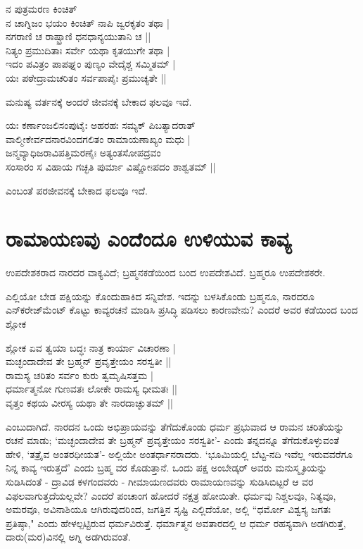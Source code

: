 \begin{shloka} 
ನ ಪುತ್ರಮರಣ ಕಿಂಚಿತ್‍\label{180}\\
ನ ಚಾಗ್ನಿಜಂ ಭಯಂ ಕಿಂಚಿತ್‍ ನಾಪಿ ಜ್ವರಕೃತಂ ತಥಾ |\\ 
ನಗರಾಣಿ ಚ ರಾಷ್ಟ್ರಾಣಿ ಧನಧಾನ್ಯಯುತಾನಿ ಚ ||\\ 
ನಿತ್ಯಂ ಪ್ರಮುದಿತಾಃ ಸರ್ವೇ ಯಥಾ ಕೃತಯುಗೇ ತಥಾ |\\ 
ಇದಂ ಪವಿತ್ರಂ ಪಾಪಘ್ನಂ ಪುಣ್ಯಂ ವೇದೈಶ್ಚ ಸಮ್ಮಿತಮ್‍ |\label{181}\\ 
ಯಃ ಪಠೇದ್ರಾಮಚರಿತಂ ಸರ್ವಪಾಪೈಃ ಪ್ರಮುಚ್ಯತೇ ||
\end{shloka} 

ಮನುಷ್ಯ ವರ್ತನಕ್ಕೆ ಅಂದರೆ ಜೀವನಕ್ಕೆ ಬೇಕಾದ ಫಲವೂ ಇದೆ. 

\begin{shloka} 
ಯಃ ಕರ್ಣಾಂಜಲಿಸಂಪುಟೈಃ ಅಹರಹಃ ಸಮ್ಯಕ್‍ ಪಿಬತ್ಯಾದರಾತ್‍\label{181b}\\ 
ವಾಲ್ಮೀಕೇರ್ವದನಾರವಿಂದಗಲಿತಂ ರಾಮಾಯಣಾಖ್ಯಂ ಮಧು |\\ 
ಜನ್ಮವ್ಯಾಧಿಜರಾವಿಪತ್ತಿಮರಣೈಃ ಅತ್ಯಂತಸೋಪದ್ರವಂ\\ 
ಸಂಸಾರಂ ಸ ವಿಹಾಯ ಗಚ್ಛತಿ ಪುರ್ಮಾ ವಿಷ್ಣೋಃಪದಂ ಶಾಶ್ವತಮ್‍ ||
\end{shloka} 
ಎಂಬಂತೆ ಪರಜೀವನಕ್ಕೆ ಬೇಕಾದ ಫಲವೂ ಇದೆ. 

\section*{ರಾಮಾಯಣವು ಎಂದೆಂದೂ ಉಳಿಯುವ ಕಾವ್ಯ} 

ಉಪದೇಶಕರಾದ ನಾರದರ ವಾಕ್ಯವಿದೆ; ಬ್ರಹ್ಮನಕಡೆಯಿಂದ ಬಂದ ಉಪದೇಶವಿದೆ. ಬ್ರಹ್ಮರೂ ಉಪದೇಶಕರೇ. 

ಎಲ್ಲಿಯೋ ಬೇಡ ಪಕ್ಷಿಯನ್ನು ಕೊಂದುಹಾಕಿದ ಸನ್ನಿವೇಶ. ಇದನ್ನು ಬಳಸಿಕೊಂಡು ಬ್ರಹ್ಮನೂ, ನಾರದರೂ ಎನ್‍ಕರೇಜ್‍ಮೆಂಟ್‍ {} ಕೊಟ್ಟು ಕಾವ್ಯರಚನೆ ಮಾಡಿಸಿ ಪ್ರಸಿದ್ಧಿ ಪಡಿಸಲು ಕಾರಣವೇನು? ಎಂದರೆ ಅವರ ಕಡೆಯಿಂದ ಬಂದ ಶ್ಲೋಕ 

\begin{shloka}
ಶ್ಲೋಕ ಏವ ತ್ವಯಾ ಬದ್ಧಃ ನಾತ್ರ ಕಾರ್ಯಾ ವಿಚಾರಣಾ |\label{181c}\\ 
ಮಚ್ಛಂದಾದೇವ ತೇ ಬ್ರಹ್ಮನ್‍ ಪ್ರವೃತ್ತೇಯಂ ಸರಸ್ವತೀ ||\\ 
ರಾಮಸ್ಯ ಚರಿತಂ ಸರ್ವಂ ಕುರು ತ್ವಮೃಷಿಸತ್ತಮ |\\ 
ಧರ್ಮಾತ್ಮನೋ ಗುಣವತಃ ಲೋಕೇ ರಾಮಸ್ಯ ಧೀಮತಃ ||\\ 
ವೃತ್ತಂ ಕಥಯ ವೀರಸ್ಯ ಯಥಾ ತೇ ನಾರದಾಚ್ಘುತಮ್‍ ||
\end{shloka} 

ಎಂಬುದಾಗಿದೆ. ನಾರದನ ಒಂದು ಅಭಿಪ್ರಾಯವನ್ನು ತೆಗೆದುಕೊಂಡು ಧರ್ಮ ಪ್ರಭುವಾದ ಆ ರಾಮನ ಚರಿತೆಯನ್ನು ರಚನೆ ಮಾಡು; `ಮಚ್ಛಂದಾದೇವ ತೇ ಬ್ರಹ್ಮನ್‍ ಪ್ರವೃತ್ತೇಯಂ ಸರಸ್ವತೀ'- ಎಂದು ತನ್ನದನ್ನೂ ತೆಗೆದುಕೊಳ್ಳುವಂತೆ ಹೇಳಿ, `ತತ್ರೈವ ಅಂತರಧೀಯತ'-\label{181a} ಅಲ್ಲಿಯೇ ಅಂತರ್ಧಾನರಾದರು. `ಭೂಮಿಯಲ್ಲಿ ಬೆಟ್ಟ-ನದಿ ಇವೆಲ್ಲ ಇರುವವರೆಗೂ ನಿನ್ನ ಕಾವ್ಯ ಇರುತ್ತದೆ' ಎಂದು ಬ್ರಹ್ಮ ವರ ಕೊಡುತ್ತಾನೆ. ಒಂದು ಪಕ್ಷ ಅಂಬೇಡ್ಕರ್‍ ಅವರು ಮನುಸ್ಮೃತಿಯನ್ನು ಸುಡಿಸಿದಂತೆ - ದ್ರಾವಿಡ ಕಳಗಂದವರು - ಗೀಮಾಯಣದವರು ರಾಮಾಯಣವನ್ನು ಸುಡಿಸಿಬಿಟ್ಟರೆ ಆ ವರ ವಿಫಲವಾಗುತ್ತದೆಯಲ್ಲವೇ? ಎಂದರೆ ಪಂಚಾಂಗ ಹೋದರೆ ನಕ್ಷತ್ರ ಹೋಯಿತೇ. ಧರ್ಮವು ನಿಶ್ಚಲವೂ, ನಿತ್ಯವೂ, ಅಮರವೂ, ಅವಿನಾಶಿಯೂ ಆಗಿರುವುದರಿಂದ, ಜಗತ್ತಿನ ಸೃಷ್ಟಿ ಎಲ್ಲಿದೆಯೋ, ಅಲ್ಲಿ ``ಧರ್ಮೋ ವಿಶ್ವಸ್ಯ ಜಗತಃ ಪ್ರತಿಷ್ಠಾ,"\label{182} ಎಂದು ಹೇಳಲ್ಪಟ್ಟಿರುವ ಧರ್ಮವಿರುತ್ತೆ. ಧರ್ಮಾತ್ಮನ ಅವತಾರದಲ್ಲಿ ಆ ಧರ್ಮ ರಹಸ್ಯವಾಗಿ ಅಡಗಿರುತ್ತೆ, ದಾರು(ಮರ)ವಿನಲ್ಲಿ ಅಗ್ನಿ ಅಡಗಿರುವಂತೆ. 

